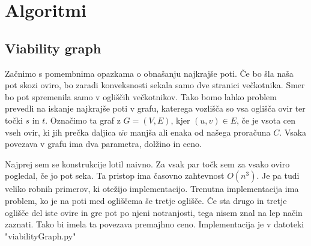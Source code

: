 \documentclass{article}
\begin{document}

\section*{Algoritmi}

\subsection*{Viability graph}

Začnimo s pomembnima opazkama o obnašanju najkrajše poti. Če bo šla naša pot skozi oviro, bo zaradi konveksnosti sekala samo dve stranici večkotnika. Smer bo pot spremenila samo v ogliščih večkotnikov. Tako bomo lahko problem prevedli na iskanje najkrajše poti v grafu, katerega vozlišča so vsa oglišča ovir ter točki $s$ in $t$. Označimo ta graf z $G = (V, E)$, kjer $(u,v) \in E$, če je vsota cen vseh ovir, ki jih prečka daljica $\overline{uv}$ manjša ali enaka od našega proračuna $C$. Vsaka povezava v grafu ima dva parametra, dolžino in ceno. 

Najprej sem se konstrukcije lotil naivno. Za vsak par točk sem za vsako oviro pogledal, če jo pot seka. Ta pristop ima časovno zahtevnost $O(n^3)$. Je pa tudi veliko robnih primerov, ki otežijo implementacijo. Trenutna implementacija ima problem, ko je na poti med ogliščema še tretje oglišče. Če sta drugo in tretje oglišče del iste ovire in gre pot po njeni notranjosti, tega nisem znal na lep način zaznati. Tako bi imela ta povezava premajhno ceno. Implementacija je v datoteki "viabilityGraph.py"
\end{document}
